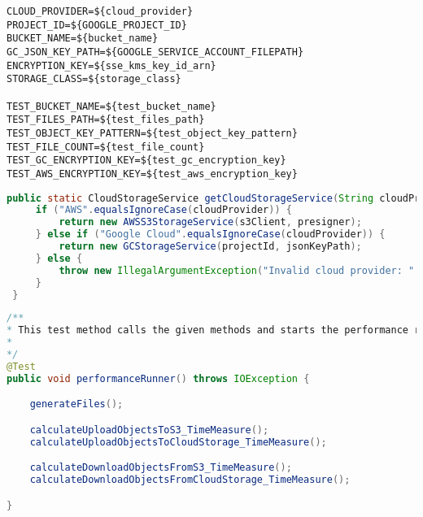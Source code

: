 \begin{lstlisting}[caption=application.properties Datei - Umgebungsvariablen des Prototyps]
CLOUD_PROVIDER=${cloud_provider}
PROJECT_ID=${GOOGLE_PROJECT_ID}
BUCKET_NAME=${bucket_name}
GC_JSON_KEY_PATH=${GOOGLE_SERVICE_ACCOUNT_FILEPATH}
ENCRYPTION_KEY=${sse_kms_key_id_arn}
STORAGE_CLASS=${storage_class}

TEST_BUCKET_NAME=${test_bucket_name}
TEST_FILES_PATH=${test_files_path}
TEST_OBJECT_KEY_PATTERN=${test_object_key_pattern}
TEST_FILE_COUNT=${test_file_count}
TEST_GC_ENCRYPTION_KEY=${test_gc_encryption_key}
TEST_AWS_ENCRYPTION_KEY=${test_aws_encryption_key}
\end{lstlisting}

\begin{lstlisting}[language=Java, caption=getCloudStorageService() Methode der Klasse CloudStorageServiceFactory]
public static CloudStorageService getCloudStorageService(String cloudProvider, String projectId, String jsonKeyPath, S3Presigner presigner, S3Client s3Client) throws IOException {
     if ("AWS".equalsIgnoreCase(cloudProvider)) {
         return new AWSS3StorageService(s3Client, presigner);
     } else if ("Google Cloud".equalsIgnoreCase(cloudProvider)) {
         return new GCStorageService(projectId, jsonKeyPath);
     } else {
         throw new IllegalArgumentException("Invalid cloud provider: " + cloudProvider);
     }
 }	
\end{lstlisting}

\newpage

\begin{lstlisting}[language=Java, caption=performanceRunner() Methode der Klasse PerformanceTest]
/**
* This test method calls the given methods and starts the performance runner.
*
*/
@Test
public void performanceRunner() throws IOException {

    generateFiles();

    calculateUploadObjectsToS3_TimeMeasure();
    calculateUploadObjectsToCloudStorage_TimeMeasure();

    calculateDownloadObjectsFromS3_TimeMeasure();
    calculateDownloadObjectsFromCloudStorage_TimeMeasure();

}
\end{lstlisting}

